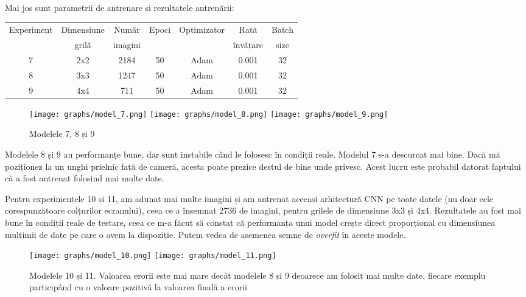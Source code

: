 Mai jos sunt parametrii de antrenare și rezultatele antrenării:

\begin{center}
    \begin{tabular}{ c | c | c | c | c | c | c }
        \hline
        Experiment & Dimensiune & Număr   & Epoci & Optimizator & Rată     & Batch \\ 
                   & grilă      & imagini &       &             & învățare & size  \\ 
        \hline
        7 & 2x2 & 2184 & 50 & Adam & 0.001 & 32 \\
        \hline
        8 & 3x3 & 1247 & 50 & Adam & 0.001 & 32 \\
        \hline
        9 & 4x4 & 711 & 50 & Adam & 0.001 & 32 \\
        \hline
    \end{tabular}
\end{center}

\begin{figure}[h]
    \centering
    \texttt{[image: graphs/model\_7.png]}
    \texttt{[image: graphs/model\_8.png]}
    \texttt{[image: graphs/model\_9.png]}
    \caption{Modelele 7, 8 și 9}
\end{figure}

Modelele 8 și 9 au performanțe bune, dar sunt instabile când le folosesc în condiții reale.
Modelul 7 s-a descurcat mai bine.
Dacă mă poziționez la un unghi prielnic față de cameră, acesta poate prezice destul de bine unde privesc.
Acest lucru este probabil datorat faptului că a fost antrenat folosind mai multe date.

Pentru experimentele 10 și 11, am adunat mai multe imagini și am antrenat aceeași arhitectură CNN pe toate datele (nu doar cele corespunzătoare colțurilor ecranului), ceea ce a însemnat 2736 de imagini, pentru grilele de dimensiune 3x3 și 4x4.
Rezultatele au fost mai bune în condiții reale de testare, ceea ce m-a făcut să constat că performanța unui model crește direct proporțional cu dimensiunea mulțimii de date pe care o avem la dispoziție.
Putem vedea de asemenea semne de \emph{overfit} în aceste modele.

\begin{figure}
    \centering
    \texttt{[image: graphs/model\_10.png]}
    \texttt{[image: graphs/model\_11.png]}
    \caption{Modelele 10 și 11. Valoarea erorii este mai mare decât modelele 8 și 9 deoarece am folosit mai multe date, fiecare exemplu participând cu o valoare pozitivă la valoarea finală a erorii}
\end{figure}

